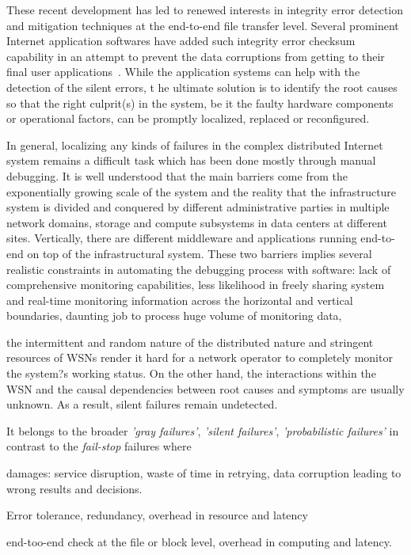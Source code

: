 These recent development has led to renewed interests in integrity error detection and mitigation techniques at the end-to-end file transfer level. 
Several prominent Internet application softwares have added such integrity error checksum capability in an attempt to prevent the data corruptions 
from getting to their final user  applications~\cite{IntegrityVerification:DataTransfer}. While the application systems can help with the detection of the silent errors, t
he ultimate solution is to identify the root causes so that the right culprit(s) in the system, be it the faulty hardware components or operational factors, can be promptly localized, replaced or reconfigured. 

In general, localizing any kinds of failures in the complex distributed Internet system remains a difficult task which has been done mostly through manual debugging. 
It is well understood that the main barriers come from the exponentially growing scale of the system and the reality that the 
infrastructure system is divided and conquered by different administrative parties in multiple network domains, storage and compute subsystems in data centers at different sites. 
Vertically, there are different middleware and applications running end-to-end on top of the infrastructural system. These two barriers implies several realistic constraints 
in automating the debugging process with software: lack of comprehensive monitoring capabilities, less likelihood in freely sharing system and real-time monitoring information across 
the horizontal and vertical boundaries, daunting job to process huge volume of monitoring data, 


 the intermittent and random nature of 
the distributed nature and stringent resources of WSNs render it hard for a network operator to completely monitor the system?s working status.
On the other hand, the interactions within the WSN and the causal dependencies between root causes and symptoms are usually unknown.
As a result, silent failures remain undetected.

It belongs to the broader {\it'gray failures'}, {\it'silent failures'}, {\it'probabilistic failures'}  in contrast to the {\it fail-stop} failures where

damages: service disruption, waste of time in retrying, data corruption leading to wrong results and decisions. 
  
Error tolerance, redundancy, overhead in resource and latency

end-too-end check at the file or block level, overhead in computing and latency.

